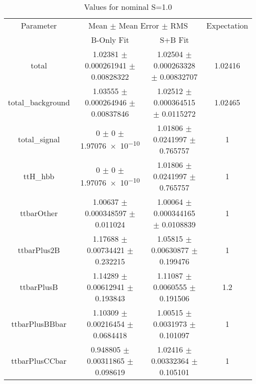 \begin{table}
\centering
\caption{Values for nominal S=1.0}
\begin{tabular}{cccc}
\toprule
Parameter & \multicolumn{2}{c}{Mean $\pm$ Mean Error $\pm$ RMS} & Expectation\\
 & B-Only Fit & S+B Fit & \\
\midrule
total & \num{1.02381} $\pm$ \num{0.000261941} $\pm$ \num{0.00828322} & \num{1.02504} $\pm$ \num{0.000263328} $\pm$ \num{0.00832707} & \num{1.02416}\\
total\_background & \num{1.03555} $\pm$ \num{0.000264946} $\pm$ \num{0.00837846} & \num{1.02512} $\pm$ \num{0.000364515} $\pm$ \num{0.0115272} & \num{1.02465}\\
total\_signal & \num{0} $\pm$ \num{0} $\pm$ \num{1.97076e-10} & \num{1.01806} $\pm$ \num{0.0241997} $\pm$ \num{0.765757} & \num{1}\\
ttH\_hbb & \num{0} $\pm$ \num{0} $\pm$ \num{1.97076e-10} & \num{1.01806} $\pm$ \num{0.0241997} $\pm$ \num{0.765757} & \num{1}\\
ttbarOther & \num{1.00637} $\pm$ \num{0.000348597} $\pm$ \num{0.011024} & \num{1.00064} $\pm$ \num{0.000344165} $\pm$ \num{0.0108839} & \num{1}\\
ttbarPlus2B & \num{1.17688} $\pm$ \num{0.00734421} $\pm$ \num{0.232215} & \num{1.05815} $\pm$ \num{0.00630877} $\pm$ \num{0.199476} & \num{1}\\
ttbarPlusB & \num{1.14289} $\pm$ \num{0.00612941} $\pm$ \num{0.193843} & \num{1.11087} $\pm$ \num{0.0060555} $\pm$ \num{0.191506} & \num{1.2}\\
ttbarPlusBBbar & \num{1.10309} $\pm$ \num{0.00216454} $\pm$ \num{0.0684418} & \num{1.00515} $\pm$ \num{0.0031973} $\pm$ \num{0.101097} & \num{1}\\
ttbarPlusCCbar & \num{0.948805} $\pm$ \num{0.00311865} $\pm$ \num{0.098619} & \num{1.02416} $\pm$ \num{0.00332364} $\pm$ \num{0.105101} & \num{1}\\
\bottomrule
\end{tabular}
\end{table}